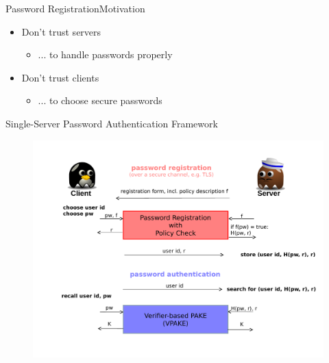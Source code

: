 \documentclass[notes,xcolor=dvipsnames]{beamer}
\begin{document}
\newsavebox{\savelisting}
\newenvironment{listing}
{\vspace*{-2em}\begin{lrbox}{\savelisting}
\begin{minipage}{4.8in}
\begin{flushleft}}
{\end{flushleft}
\end{minipage}
\end{lrbox}
\begin{center}
\resizebox{\columnwidth}{!}{\setlength\fboxsep{6pt}\fbox{\usebox{\savelisting}}}
\end{center}}

\begin{frame}{Password Registration}{Motivation}
  \begin{itemize}
    \item Don't trust servers
    \begin{itemize}
      \item ... to handle passwords properly
    \end{itemize}
    \vspace*{2em}\pause
    \item Don't trust clients
    \begin{itemize}
      \item ... to choose secure passwords
    \end{itemize}
  \end{itemize}
\end{frame}

\begin{frame}{Single-Server Password Authentication Framework}
  \begin{figure}
  \centering
  \includegraphics[width=\textwidth]{framework1.pdf}
  \end{figure}
\end{frame}
\end{document}
